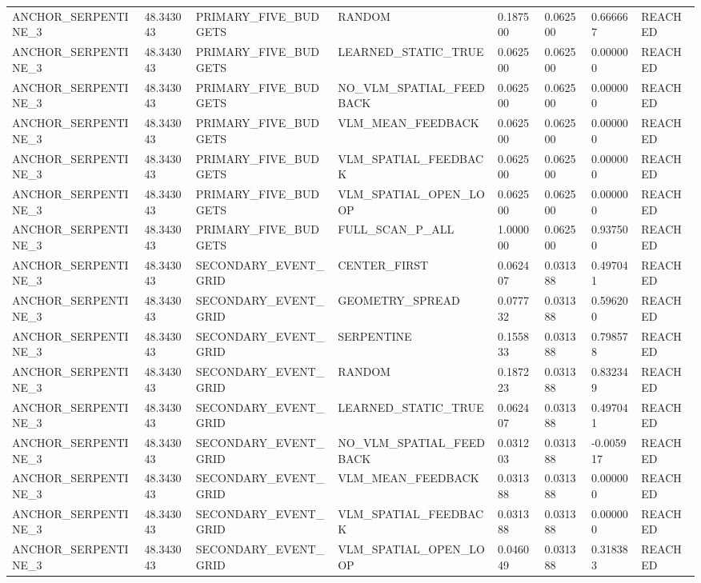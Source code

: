 \begin{tabular}{llllllll}
ANCHOR\_SERPENTINE\_3 & 48.343043 & PRIMARY\_FIVE\_BUDGETS & RANDOM & 0.187500 & 0.062500 & 0.666667 & REACHED \\
ANCHOR\_SERPENTINE\_3 & 48.343043 & PRIMARY\_FIVE\_BUDGETS & LEARNED\_STATIC\_TRUE & 0.062500 & 0.062500 & 0.000000 & REACHED \\
ANCHOR\_SERPENTINE\_3 & 48.343043 & PRIMARY\_FIVE\_BUDGETS & NO\_VLM\_SPATIAL\_FEEDBACK & 0.062500 & 0.062500 & 0.000000 & REACHED \\
ANCHOR\_SERPENTINE\_3 & 48.343043 & PRIMARY\_FIVE\_BUDGETS & VLM\_MEAN\_FEEDBACK & 0.062500 & 0.062500 & 0.000000 & REACHED \\
ANCHOR\_SERPENTINE\_3 & 48.343043 & PRIMARY\_FIVE\_BUDGETS & VLM\_SPATIAL\_FEEDBACK & 0.062500 & 0.062500 & 0.000000 & REACHED \\
ANCHOR\_SERPENTINE\_3 & 48.343043 & PRIMARY\_FIVE\_BUDGETS & VLM\_SPATIAL\_OPEN\_LOOP & 0.062500 & 0.062500 & 0.000000 & REACHED \\
ANCHOR\_SERPENTINE\_3 & 48.343043 & PRIMARY\_FIVE\_BUDGETS & FULL\_SCAN\_P\_ALL & 1.000000 & 0.062500 & 0.937500 & REACHED \\
ANCHOR\_SERPENTINE\_3 & 48.343043 & SECONDARY\_EVENT\_GRID & CENTER\_FIRST & 0.062407 & 0.031388 & 0.497041 & REACHED \\
ANCHOR\_SERPENTINE\_3 & 48.343043 & SECONDARY\_EVENT\_GRID & GEOMETRY\_SPREAD & 0.077732 & 0.031388 & 0.596200 & REACHED \\
ANCHOR\_SERPENTINE\_3 & 48.343043 & SECONDARY\_EVENT\_GRID & SERPENTINE & 0.155833 & 0.031388 & 0.798578 & REACHED \\
ANCHOR\_SERPENTINE\_3 & 48.343043 & SECONDARY\_EVENT\_GRID & RANDOM & 0.187223 & 0.031388 & 0.832349 & REACHED \\
ANCHOR\_SERPENTINE\_3 & 48.343043 & SECONDARY\_EVENT\_GRID & LEARNED\_STATIC\_TRUE & 0.062407 & 0.031388 & 0.497041 & REACHED \\
ANCHOR\_SERPENTINE\_3 & 48.343043 & SECONDARY\_EVENT\_GRID & NO\_VLM\_SPATIAL\_FEEDBACK & 0.031203 & 0.031388 & -0.005917 & REACHED \\
ANCHOR\_SERPENTINE\_3 & 48.343043 & SECONDARY\_EVENT\_GRID & VLM\_MEAN\_FEEDBACK & 0.031388 & 0.031388 & 0.000000 & REACHED \\
ANCHOR\_SERPENTINE\_3 & 48.343043 & SECONDARY\_EVENT\_GRID & VLM\_SPATIAL\_FEEDBACK & 0.031388 & 0.031388 & 0.000000 & REACHED \\
ANCHOR\_SERPENTINE\_3 & 48.343043 & SECONDARY\_EVENT\_GRID & VLM\_SPATIAL\_OPEN\_LOOP & 0.046049 & 0.031388 & 0.318383 & REACHED \\

\end{tabular}
